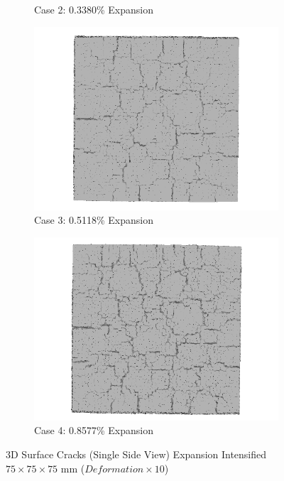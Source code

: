 \begin{figure}[!h]
\begin{subfigure}{.5\textwidth}
    \caption{Case 2: 0.3380\% Expansion}
    \end{subfigure}%
    \begin{subfigure}{.5\textwidth}
      \centering
      \includegraphics[width=.8\linewidth]{Files/exp_3D/DEF/A30X-5C_3_3ds.png}
    \caption{Case 3: 0.5118\% Expansion}
    \end{subfigure}
    \begin{subfigure}{.5\textwidth}
      \centering
      \includegraphics[width=.8\linewidth]{Files/exp_3D/DEF/A30X-5C_4_3ds.png}
    \caption{Case 4: 0.8577\% Expansion}
    \end{subfigure}%

  \caption{3D Surface Cracks (Single Side View) Expansion Intensified $75 \times 75 \times 75$ mm ($Deformation \times 10$)}
  \label{fig:ASR_A30X-5ssC_3DS}
\end{figure}

